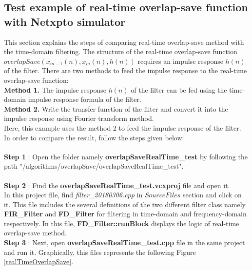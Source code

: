 \subsection*{Test example of real-time overlap-save function with Netxpto simulator}
This section explains the steps of comparing real-time overlap-save method with the time-domain filtering. The structure of the real-time overlap-save function $overlapSave(x_{m-1}(n), x_{m}(n), h(n))$ requires an impulse response $h(n)$ of the filter. There are two methods to feed the impulse response to the real-time overlap-save function:\\
\textbf{Method 1.} The impulse response $h(n)$ of the filter can be fed using the time-domain impulse response formula of the filter.\\
\textbf{Method 2.} Write the transfer function of the filter and convert it into the impulse response using Fourier transform method. \\
Here, this example uses the method 2 to feed the impulse response of the filter. In order to compare the result, follow the steps given below:\\ \\
\textbf{Step 1} : Open the folder namely \textbf{overlapSaveRealTime\_test} by following the path "/algorithms/overlapSave/overlapSaveRealTime\_test".\\ \\
\textbf{Step 2} : Find the \textbf{overlapSaveRealTime\_test.vcxproj} file and open it.\\
In this project file, find \textit{filter\_20180306.cpp} in $Source Files$ section and click on it. This file includes the several definitions of the two different filter class namely \textbf{FIR\_Filter} and \textbf{FD\_Filter} for filtering in time-domain and frequency-domain respectively. In this file, \textbf{FD\_Filter::runBlock} displays the logic of real-time overlap-save method.\\

\textbf{Step 3} : Next, open \textbf{overlapSaveRealTime\_test.cpp} file in the same project and run it. Graphically, this files represents the following Figure \ref*{realTimeOverlapSave}.\\
